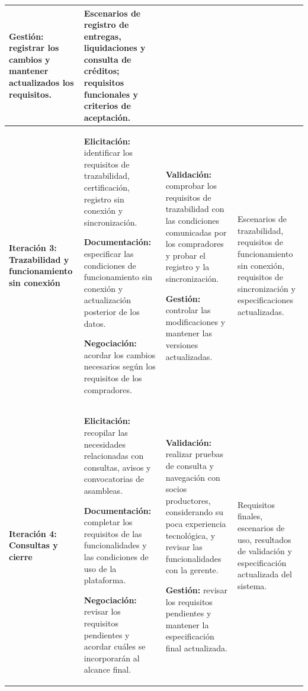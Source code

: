 \documentclass[12pt,a4paper]{article}
\begin{document}
\begin{table}[H]
\begin{tabularx}{\textwidth}{
    >{\raggedright\arraybackslash}p{2.1cm} Y Y Y
}
\textbf{Gestión:} registrar los cambios y mantener actualizados los requisitos.
&
Escenarios de registro de entregas, liquidaciones y consulta de créditos; requisitos funcionales y criterios de aceptación.
\\
\midrule

\textbf{Iteración 3: Trazabilidad y funcionamiento sin conexión}
&
\textbf{Elicitación:} identificar los requisitos de trazabilidad, certificación, registro sin conexión y sincronización.

\textbf{Documentación:} especificar las condiciones de funcionamiento sin conexión y actualización posterior de los datos.

\textbf{Negociación:} acordar los cambios necesarios según los requisitos de los compradores.
&
\textbf{Validación:} comprobar los requisitos de trazabilidad con las condiciones comunicadas por los compradores y probar el registro y la sincronización.

\textbf{Gestión:} controlar las modificaciones y mantener las versiones actualizadas.
&
Escenarios de trazabilidad, requisitos de funcionamiento sin conexión, requisitos de sincronización y especificaciones actualizadas.
\\
\midrule

\textbf{Iteración 4: Consultas y cierre}
&
\textbf{Elicitación:} recopilar las necesidades relacionadas con consultas, avisos y convocatorias de asambleas.

\textbf{Documentación:} completar los requisitos de las funcionalidades y las condiciones de uso de la plataforma.

\textbf{Negociación:} revisar los requisitos pendientes y acordar cuáles se incorporarán al alcance final.
&
\textbf{Validación:} realizar pruebas de consulta y navegación con socios productores, considerando su poca experiencia tecnológica, y revisar las funcionalidades con la gerente.

\textbf{Gestión:} revisar los requisitos pendientes y mantener la especificación final actualizada.
&
Requisitos finales, escenarios de uso, resultados de validación y especificación actualizada del sistema.
\\
\bottomrule
\end{tabularx}
\end{table}

\FloatBarrier


\end{document}
